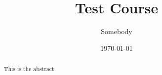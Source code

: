\documentclass{xourse}
\title{Test Course}
\author{Somebody}
\date{\today}
\begin{document}
\begin{abstract}
	This is the abstract.
\end{abstract}

\maketitle

\tableofcontents


\end{document}

